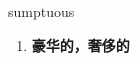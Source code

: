 
\begin{frame}
{\huge sumptuous}
\begin{center}
\begin{enumerate}\Large
  \item \textbf{豪华的，奢侈的}
\end{enumerate}
\end{center}
\end{frame}

